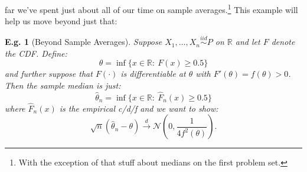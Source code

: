 \documentclass{tufte-book}
\theoremstyle{mytheoremstyle}
\theoremstyle{mylemstyle}
\theoremstyle{mydefstyle}
\newtheorem*{ex}{E.g.}
\begin{document}
 far we've spent just about all of our time on sample averages.\footnote{With the exception of that stuff about medians on the first problem set.} This example will help us move beyond just that:
\begin{ex}[Beyond Sample Averages] Suppose \(X_1, \dots, X_n \overset{iid}{\sim} P\) on \(\mathbb{R}\) and let \(F\) denote the CDF. Define:
	\[\theta = \inf \{x \in \mathbb{R}:\ F(x) \ge 0.5\}\]
and further suppose that \(F(\cdot)\) is differentiable at \(\theta\) with \(F'(\theta) = f(\theta) > 0\). Then the sample median is just:
	\[\hat{\theta}_n = \inf \{x \in \mathbb{R}:\ \hat{F}_n(x) \ge 0.5\}\]
where \(\hat{F}_n(x)\) is the empirical c/d/f and we want to show:
	\[\sqrt{n}(\hat{\theta}_n - \theta) \overset{d}{\rightarrow} \mathcal{N}\left(0, \frac{1}{4f^2(\theta)}\right) \text{.}\]
	

\end{ex}
\end{document}

